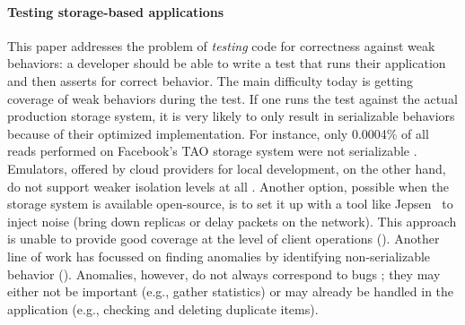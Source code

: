 \paragraph{Testing storage-based applications}
This paper addresses the problem of \textit{testing} code for correctness
against weak behaviors: a developer should be able to write a test that runs
their application and then asserts for correct behavior. 
The main difficulty today is getting coverage of weak behaviors during
the test. If one runs the test
against the actual production storage system, it is very likely to only result in
serializable behaviors because of their optimized implementation. For
instance, only 0.0004\% of all reads performed on Facebook's TAO storage system 
were not serializable \cite{DBLP:conf/sosp/LuVAHSTKL15}. 
Emulators, offered by cloud providers for local development, on the other hand, do not support weaker
isolation levels at all \cite{cosmosdb-local}. Another option, possible when
the storage system is available open-source, is to set it up with a 
tool like Jepsen~\cite{jepsen} to inject noise (bring down replicas or
delay packets on the network). 
This approach is unable to provide good coverage at the level of client operations
\cite{DBLP:journals/pacmpl/RahmaniNDJ19} (). Another line of work has focussed on finding
anomalies by identifying non-serializable behavior (). Anomalies, however, do not
always correspond to bugs \cite{DBLP:conf/pldi/BrutschyD0V18,DBLP:journals/pvldb/GanRRB020}; they may
either not be important (e.g., gather statistics) or may already be handled in
the application (e.g., checking and deleting duplicate items).



%


